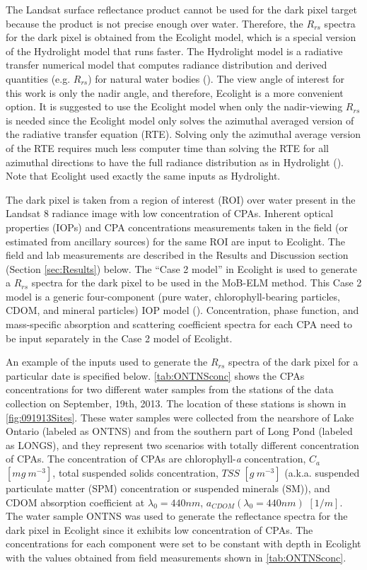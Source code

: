 \documentclass[onecolumn,3p,letterpaper]{elsarticle}
\begin{document}
The Landsat surface reflectance product cannot be used for the dark pixel target because the product is not precise enough over water. Therefore, the $R_{rs}$ spectra for the dark pixel is obtained from the Ecolight model, which is a special version of the Hydrolight model that runs faster. The Hydrolight model is a radiative transfer numerical model that computes radiance distribution and derived quantities (e.g. $R_{rs}$) for natural water bodies (\cite{MobleyHE}). The view angle of interest for this work is only the nadir angle, and therefore, Ecolight is a more convenient option. It is suggested to use the Ecolight model when only the nadir-viewing $R_{rs}$ is needed since the Ecolight model only solves the azimuthal averaged version of the radiative transfer equation (RTE). Solving only the azimuthal average version of the RTE requires much less computer time than solving the RTE for all azimuthal directions to have the full radiance distribution as in Hydrolight (\cite{MobleyHE}). Note that Ecolight used exactly the same inputs as Hydrolight.

The dark pixel is taken from a region of interest (ROI) over water present in the Landsat 8 radiance image with low concentration of CPAs. Inherent optical properties (IOPs) and CPA concentrations measurements taken in the field (or estimated from ancillary sources) for the same ROI are input to Ecolight. The field and lab measurements are described in the Results and Discussion section (Section \ref{sec:Results}) below. The ``Case 2 model'' in Ecolight is used to generate a $R_{rs}$ spectra for the dark pixel to be used in the MoB-ELM method. This Case 2 model is a generic four-component (pure water, chlorophyll-bearing particles, CDOM, and mineral particles) IOP model (\cite{MobleyHEtech}). Concentration, phase function, and mass-specific absorption and scattering coefficient spectra for each CPA need to be input separately in the Case 2 model of Ecolight. 

An example of the inputs used to generate the $R_{rs}$ spectra of the dark pixel for a particular date is specified below. \autoref{tab:ONTNSconc} shows the CPAs concentrations for two different water samples from the stations of the data collection on September, 19th, 2013. The location of these stations is shown in \autoref{fig:091913Sites}. These water samples were collected from the nearshore of Lake Ontario (labeled as ONTNS) and from the southern part of Long Pond (labeled as LONGS), and they represent two scenarios with totally different concentration of CPAs. The concentration of CPAs are chlorophyll-{\it a} concentration, $C_a$ $[mg~m^{-3}]$, total suspended solids concentration, $TSS$ $[g~m^{-3}]$ (a.k.a. suspended particulate matter (SPM) concentration or suspended minerals (SM)), and CDOM absorption coefficient at $\lambda_0=440nm$, $a_{CDOM}(\lambda_0=440nm)$ $[1/m]$. The water sample ONTNS was used to generate the reflectance spectra for the dark pixel in Ecolight since it exhibits low concentration of CPAs. The concentrations for each component were set to be constant with depth in Ecolight with the values obtained from field measurements shown in \autoref{tab:ONTNSconc}.
\end{document}
